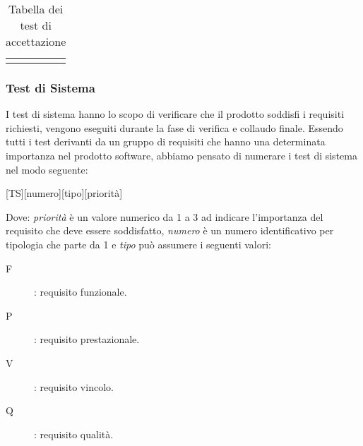 \documentclass[../piano-di-qualifica.tex]{subfiles}
\begin{document}
\begin{longtable}[H]{>{\centering\bfseries}m{3cm} >{}m{10cm} >{\centering\arraybackslash}m{3cm}}
    \rowcolor{white}
    \caption{Tabella dei test di accettazione}%
    \label{tab:test_accettazione}
  \end{longtable}


\subsubsection{Test di Sistema}%
\label{subs:test_di_sistema}

I test di sistema hanno lo scopo di verificare che il prodotto soddisfi i requisiti richiesti, vengono eseguiti durante la fase di verifica e collaudo finale.
Essendo tutti i test derivanti da un gruppo di requisiti che hanno una determinata importanza nel prodotto software, abbiamo pensato di numerare i test di sistema nel modo seguente:
\begin{center}
  [TS][numero][tipo][priorità]
\end{center}

Dove: \textit{priorità} è un valore numerico da 1 a 3 ad indicare l'importanza del requisito che deve essere soddisfatto, \textit{numero} è un numero identificativo per tipologia che parte da 1 e \textit{tipo} può assumere i seguenti valori:
\begin{description}
  \item [F]: requisito funzionale.
  \item [P]: requisito prestazionale.
  \item [V]: requisito vincolo.
  \item [Q]: requisito qualità.
\end{description}
\end{document}
